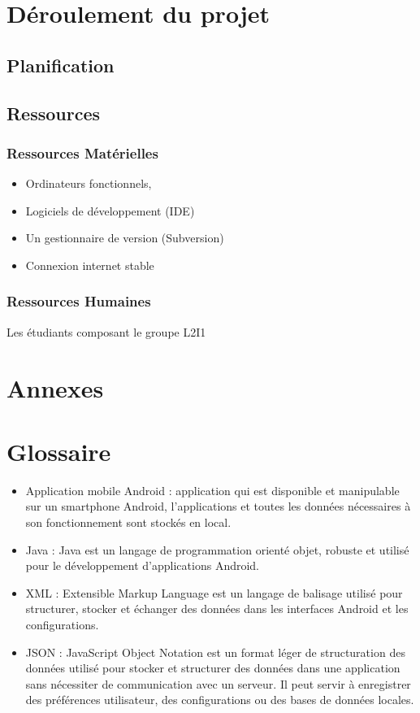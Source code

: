 \documentclass{rapportECL}
\begin{document}
\section{Déroulement du projet}
\subsection{Planification}
\subsection{Ressources}
\subsubsection{Ressources Matérielles}
\begin{itemize}[label=\textbullet]
 \item Ordinateurs fonctionnels, 
 
 \item Logiciels de développement (IDE)

 \item Un gestionnaire de version (Subversion) 

 \item Connexion internet stable
\end{itemize}
\subsubsection{Ressources Humaines}
Les étudiants composant le groupe L2I1

\section{Annexes}

\section{Glossaire}
\begin{itemize}[label=\textbullet]
\item Application mobile Android : application qui est disponible et manipulable sur un smartphone Android, l’applications et toutes les données nécessaires à son fonctionnement sont stockés en local.
\item Java : Java est un langage de programmation orienté objet, robuste et utilisé pour le développement d'applications Android.
\item XML : Extensible Markup Language est un langage de balisage utilisé pour structurer, stocker et échanger des données dans les interfaces Android et les configurations.
\item JSON : JavaScript Object Notation est un format léger de structuration des données utilisé pour stocker et structurer des données dans une application sans nécessiter de communication avec un serveur. Il peut servir à enregistrer des préférences utilisateur, des configurations ou des bases de données locales.
\end{itemize}
\end{document}
